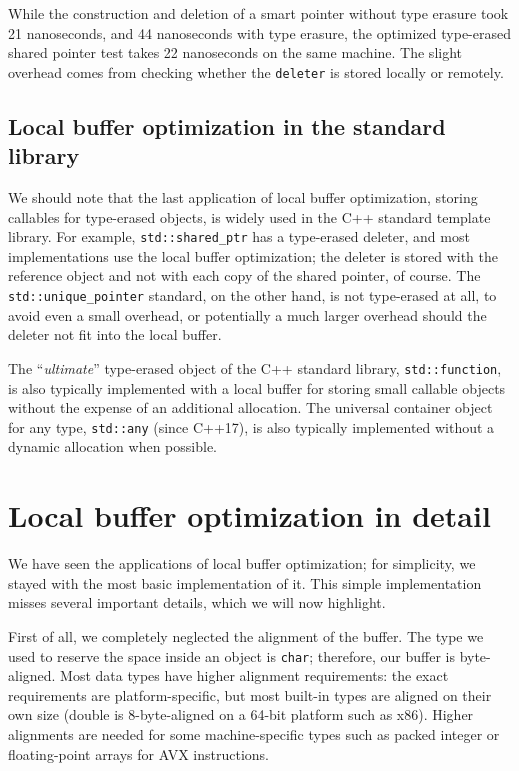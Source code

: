 While the construction and deletion of a smart pointer without type erasure took 21 nanoseconds, and 44 nanoseconds with type erasure, the optimized type-erased shared pointer test takes 22 nanoseconds on the same machine. The slight overhead comes from checking whether the \texttt{deleter} is stored locally or remotely.

\subsection{Local buffer optimization in the standard library}

We should note that the last application of local buffer optimization, storing callables for type-erased objects, is widely used in the C++ standard template library. For example, \texttt{std::shared\_ptr} has a type-erased deleter, and most implementations use the local buffer optimization; the deleter is stored with the reference object and not with each copy of the shared pointer, of course. The \texttt{std::unique\_pointer} standard, on the other hand, is not type-erased at all, to avoid even a small overhead, or potentially a much larger overhead should the deleter not fit into the local buffer.

The ``\emph{ultimate}'' type-erased object of the C++ standard library, \texttt{std::function}, is also typically implemented with a local buffer for storing small callable objects without the expense of an additional allocation. The universal container object for any type, \texttt{std::any} (since C++17), is also typically implemented without a dynamic allocation when possible.

\section{Local buffer optimization in detail}

We have seen the applications of local buffer optimization; for simplicity, we stayed with the most basic implementation of it. This simple implementation misses several important details, which we will now highlight.

First of all, we completely neglected the alignment of the buffer. The type we used to reserve the space inside an object is \texttt{char}; therefore, our buffer is byte-aligned. Most data types have higher alignment requirements: the exact requirements are platform-specific, but most built-in types are aligned on their own size (double is 8-byte-aligned on a 64-bit platform such as x86). Higher alignments are needed for some machine-specific types such as packed integer or floating-point arrays for AVX instructions.

